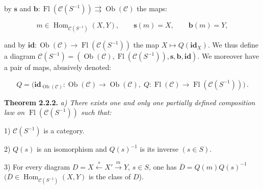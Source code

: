 \clearpage
{}%
\begingroup
\small
\setlength{\emergencystretch}{1.5em}%
\setlength{\abovedisplayskip}{1pt plus 1pt minus 1pt}%
\setlength{\belowdisplayskip}{1pt plus 1pt minus 1pt}%

\noindent by $\mathbf{s}$ and $\mathbf{b}\colon
\operatorname{Fl}(\mathcal C(S^{-1}))\rightrightarrows
\operatorname{Ob}(\mathcal C)$ the maps:

\[
  m\in\operatorname{Hom}_{\mathcal C(S^{-1})}(X,Y),\qquad
  \mathbf{s}(m)=X,\qquad \mathbf{b}(m)=Y,
\]

\noindent and by $\mathbf{id}\colon\operatorname{Ob}(\mathcal C)
\to\operatorname{Fl}(\mathcal C(S^{-1}))$ the map
$X\mapsto Q(\mathbf{id}_X)$.
%
We thus define a diagram
$\mathcal C(S^{-1})=(\operatorname{Ob}(\mathcal C),
\operatorname{Fl}(\mathcal C(S^{-1})),\mathbf{s},\mathbf{b},\mathbf{id})$.
We moreover have a pair of maps, abusively denoted:

\[
  Q=\bigl(\mathbf{id}_{\operatorname{Ob}(\mathcal C)}\colon
  \operatorname{Ob}(\mathcal C)\to\operatorname{Ob}(\mathcal C),\;
  Q\colon\operatorname{Fl}(\mathcal C)\to
  \operatorname{Fl}(\mathcal C(S^{-1}))\bigr)\,.
\]

\smallskip
\noindent\textbf{Theorem 2.2.2.}\quad
\begingroup\itshape
{}%
a) There exists one and only one partially defined composition law on
$\operatorname{Fl}(\mathcal C(S^{-1}))$ such that:

\par\noindent\hspace*{2em}1) $\mathcal C(S^{-1})$ is a category.

\par\noindent\hspace*{2em}2) $Q(s)$ is an isomorphism and $Q(s)^{-1}$ is its
inverse $(s\in S)$.

\par\noindent\hspace*{2em}3) For every diagram
$D=X\xleftarrow{s}X'\xrightarrow{m}Y$, $s\in S$, one has
$\overline D=Q(m)Q(s)^{-1}$
$(\overline D\in\operatorname{Hom}_{\mathcal C(S^{-1})}(X,Y)$ is the class
of $D$).

